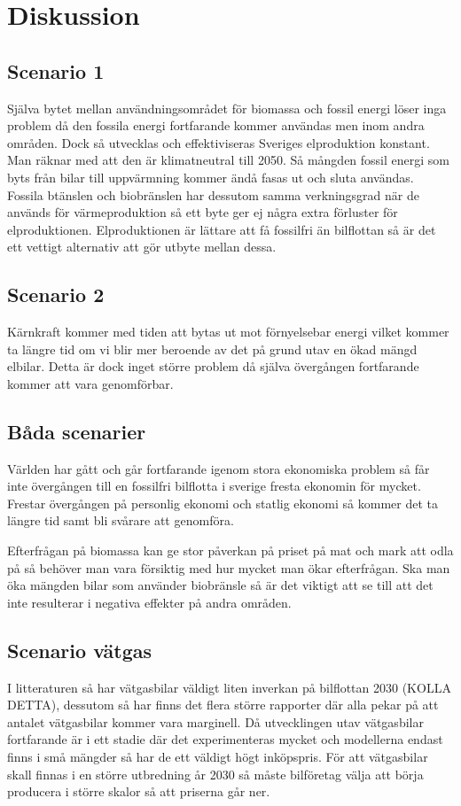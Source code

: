 \documentclass[a4paper,11pt,fleqn, titlepage]{article}
\begin{document}
\section{Diskussion}

\subsection{Scenario 1}

Själva bytet mellan användningsområdet för biomassa och fossil energi löser inga problem då den fossila energi fortfarande kommer användas men inom andra områden. Dock så utvecklas och effektiviseras Sveriges elproduktion konstant. Man räknar med att den är klimatneutral till 2050. Så mångden fossil energi som byts från bilar till uppvärmning kommer ändå fasas ut och sluta användas. Fossila btänslen och biobränslen har dessutom samma verkningsgrad när de används för värmeproduktion så ett byte ger ej några extra förluster för elproduktionen.  Elproduktionen är lättare att få fossilfri än bilflottan så är det ett vettigt alternativ att gör utbyte mellan dessa.

\subsection{Scenario 2}
Kärnkraft kommer med tiden att bytas ut mot förnyelsebar energi vilket kommer ta längre tid om vi blir mer beroende av det på grund utav en ökad mängd elbilar. Detta är dock inget större problem då själva övergången fortfarande kommer att vara genomförbar.



\subsection{Båda scenarier}
Världen har gått och går fortfarande igenom stora ekonomiska problem så får inte övergången till en fossilfri bilflotta i sverige fresta ekonomin för mycket. Frestar övergången på personlig ekonomi och statlig ekonomi så kommer det ta längre tid samt bli svårare att genomföra.


Efterfrågan på biomassa kan ge stor påverkan på priset på mat och mark att odla på så behöver man vara försiktig med hur mycket man ökar efterfrågan. Ska man öka mängden bilar som använder biobränsle så är det viktigt att se till att det inte resulterar i negativa effekter på andra områden. 

\subsection{Scenario vätgas}
I litteraturen så har vätgasbilar väldigt liten inverkan på bilflottan 2030 (KOLLA DETTA), dessutom så har finns det flera större rapporter där alla pekar på att antalet vätgasbilar kommer vara marginell.
Då utvecklingen utav vätgasbilar fortfarande är i ett stadie där det experimenteras mycket och modellerna endast finns i små mängder så har de ett väldigt högt inköpspris. För att vätgasbilar skall finnas i en större utbredning år 2030 så måste bilföretag välja att börja producera i större skalor så att priserna går ner.
\end{document}
